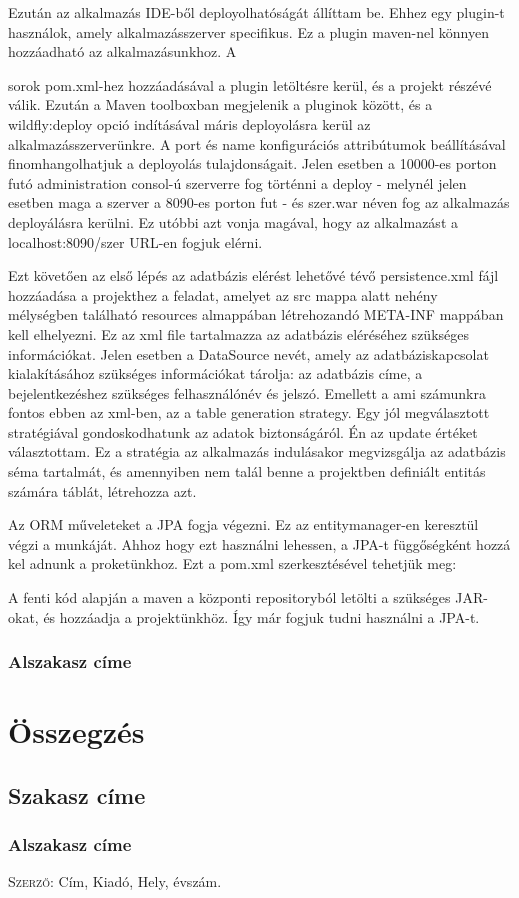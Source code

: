 \documentclass[centeredchapter]{thesis-ekf}
\theoremstyle{definition}
\theoremstyle{remark}
\begin{document}
Ezután az alkalmazás IDE-ből deployolhatóságát állíttam be. Ehhez egy plugin-t használok, amely alkalmazásszerver specifikus. Ez a plugin maven-nel könnyen hozzáadható az alkalmazásunkhoz. A 	

sorok pom.xml-hez hozzáadásával a plugin letöltésre kerül, és a projekt részévé válik. Ezután a Maven toolboxban megjelenik a pluginok között, és a wildfly:deploy opció indításával máris deployolásra kerül az alkalmazásszerverünkre. A port és name konfigurációs attribútumok beállításával finomhangolhatjuk a deployolás tulajdonságait. Jelen esetben a 10000-es porton futó administration consol-ú szerverre fog történni a deploy - melynél jelen esetben maga a szerver a 8090-es porton fut - és szer.war néven fog az alkalmazás deployálásra kerülni. Ez utóbbi azt vonja magával, hogy az alkalmazást a localhost:8090/szer URL-en fogjuk elérni. 





Ezt követően az első lépés az adatbázis elérést lehetővé tévő persistence.xml fájl hozzáadása a projekthez a feladat, amelyet az src mappa alatt nehény mélységben található resources almappában létrehozandó META-INF mappában kell elhelyezni. Ez az xml file tartalmazza az adatbázis eléréséhez szükséges információkat. Jelen esetben a DataSource nevét, amely az adatbáziskapcsolat kialakításához szükséges információkat tárolja: az adatbázis címe, a bejelentkezéshez szükséges felhasználónév és jelszó.
Emellett a ami számunkra fontos ebben az xml-ben, az a table generation strategy. Egy jól megválasztott stratégiával gondoskodhatunk az adatok biztonságáról. Én az update értéket választottam. Ez a stratégia az alkalmazás indulásakor megvizsgálja az adatbázis séma tartalmát, és amennyiben nem talál benne a projektben definiált entitás számára táblát, létrehozza azt.

Az ORM műveleteket a JPA fogja végezni. Ez az entitymanager-en keresztül végzi a munkáját. Ahhoz hogy ezt használni lehessen, a JPA-t függőségként hozzá kel adnunk a proketünkhoz. Ezt a pom.xml szerkesztésével tehetjük meg:




A fenti kód alapján a maven a központi repositoryból letölti a szükséges JAR-okat, és hozzáadja a projektünkhöz. Így már fogjuk tudni használni a JPA-t.

\subsection{Alszakasz címe}

\chapter{Összegzés}

\section{Szakasz címe}

\subsection{Alszakasz címe}


\begin{thebibliography}{1}
 \textsc{Szerző}: Cím, Kiadó, Hely, évszám.
\end{thebibliography}
\end{document}
